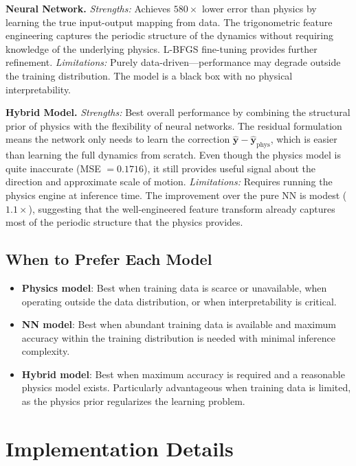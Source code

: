 \documentclass[a4paper]{article}
\begin{document}
\textbf{Neural Network.} \textit{Strengths:} Achieves $580\times$ lower error than physics by learning the true input-output mapping from data. The trigonometric feature engineering captures the periodic structure of the dynamics without requiring knowledge of the underlying physics. L-BFGS fine-tuning provides further refinement. \textit{Limitations:} Purely data-driven---performance may degrade outside the training distribution. The model is a black box with no physical interpretability.

\textbf{Hybrid Model.} \textit{Strengths:} Best overall performance by combining the structural prior of physics with the flexibility of neural networks. The residual formulation means the network only needs to learn the correction $\hat{\mathbf{y}} - \hat{\mathbf{y}}_{\text{phys}}$, which is easier than learning the full dynamics from scratch. Even though the physics model is quite inaccurate (MSE $= 0.1716$), it still provides useful signal about the direction and approximate scale of motion. \textit{Limitations:} Requires running the physics engine at inference time. The improvement over the pure NN is modest ($1.1\times$), suggesting that the well-engineered feature transform already captures most of the periodic structure that the physics provides.

\subsection{When to Prefer Each Model}

\begin{itemize}
    \item \textbf{Physics model}: Best when training data is scarce or unavailable, when operating outside the data distribution, or when interpretability is critical.
    \item \textbf{NN model}: Best when abundant training data is available and maximum accuracy within the training distribution is needed with minimal inference complexity.
    \item \textbf{Hybrid model}: Best when maximum accuracy is required and a reasonable physics model exists. Particularly advantageous when training data is limited, as the physics prior regularizes the learning problem.
\end{itemize}


\section{Implementation Details}
\end{document}
